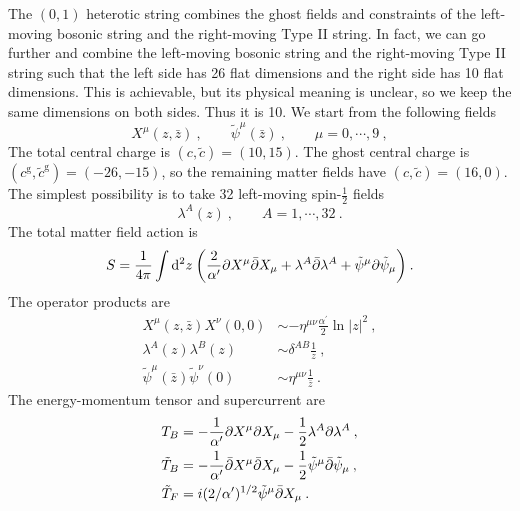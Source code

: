 The $(0,1)$ heterotic string combines the ghost fields and constraints of the left-moving bosonic string and the right-moving Type II string. In fact, we can go further and combine the left-moving bosonic string and the right-moving Type II string such that the left side has 26 flat dimensions and the right side has 10 flat dimensions. This is achievable, but its physical meaning is unclear, so we keep the same dimensions on both sides. Thus it is 10. We start from the following fields
\begin{equation}
	X^{\mu}(z,\bar{z})\:,\qquad \tilde{\psi}^{\mu}(\bar{z}) \:, \qquad \mu = 0,\cdots,9\:, \label{11.2.1}
\end{equation}
The total central charge is $(c,\tilde{c})=(10,15)$. The ghost central charge is $(c^{\text{g}},\tilde{c}^{\text{g}})=(-26,-15)$, so the remaining matter fields have $(c,\tilde{c})=(16,0)$. The simplest possibility is to take 32 left-moving spin-$\frac{1}{2}$ fields
\begin{equation}
	\lambda^{A}(z) \:, \qquad A=1,\cdots,32\:. \label{11.2.2}
\end{equation}
The total matter field action is
\begin{equation}
	S=\frac{1}{4\pi} \int \mathrm{d}^{2}z\: \biggl( \frac{2}{\alpha^{\prime}}\partial X^{\mu}\bar{\partial}X_{\mu}
	+\lambda^{A}\bar{\partial}\lambda^{A}+\tilde{\psi}^{\mu}\partial\tilde{\psi}_{\mu}\biggr)\:.\label{11.2.3}
\end{equation}
The operator products are
\begin{subequations}
	\begin{align}
		X^{\mu}(z,\bar{z})X^{\nu}(0,0) &\sim -\eta^{\mu\nu} \frac{\alpha^{\prime}}{2} \ln\lvert z\rvert^{2} \:,\label{11.2.4a} \\
		\lambda^{A}(z)\lambda^{B}(z) &\sim \delta^{AB}\frac{1}{z} \:, \label{11.2.4b} \\
		\tilde{\psi}^{\mu}(\bar{z})\tilde{\psi}^{\nu}(0) &\sim \eta^{\mu\nu}\frac{1}{\bar{z}} \:.\label{11.2.4c}
	\end{align}
\end{subequations}
The energy-momentum tensor and supercurrent are
\begin{subequations}
	\begin{align}
		T_{B} &= -\frac{1}{\alpha^{\prime}}\partial X^{\mu}\partial X_{\mu} -\frac{1}{2}\lambda^{A}\partial\lambda^{A}\:,\label{11.2.5a} \\
		\tilde{T}_{B}&= -\frac{1}{\alpha^{\prime}}\bar{\partial}X^{\mu}\bar{\partial}X_{\mu} 
		-\frac{1}{2}\tilde{\psi}^{\mu}\bar{\partial}\tilde{\psi}_{\mu} \:, \label{11.2.5b} \\
		\tilde{T}_{F}&= i(2/\alpha^{\prime})^{1/2}\tilde{\psi}^{\mu}\bar{\partial}X_{\mu} \:.\label{11.2.5c}
	\end{align} \label{11.2.5}
\end{subequations}
